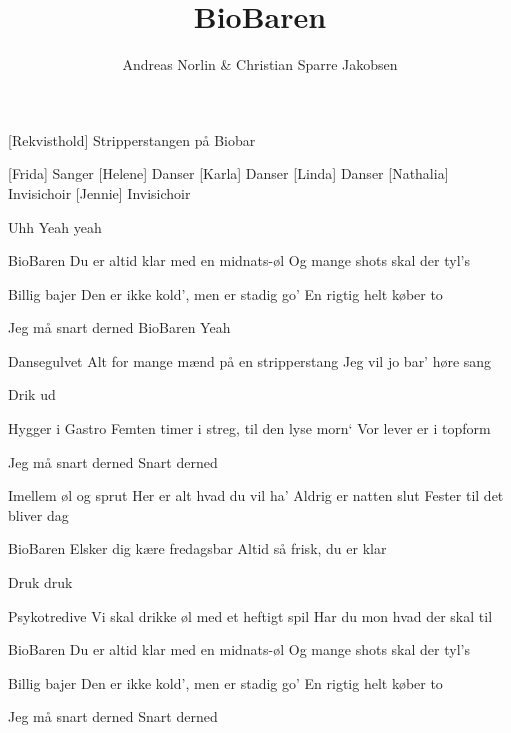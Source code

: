 \documentclass[a4paper,11pt]{article}
\title{BioBaren}
\author{Andreas Norlin \& Christian Sparre Jakobsen}
\begin{document}
\maketitle

\begin{props}
  [Rekvisthold] Stripperstangen på Biobar 
\end{props}

\begin{roles}
    [Frida] Sanger
    [Helene] Danser
    [Karla] Danser
    [Linda] Danser
    [Nathalia] Invisichoir
    [Jennie] Invisichoir
\end{roles}



\begin{song}


   Uhh
Yeah yeah
 
BioBaren
Du er altid klar med en midnats-øl
Og mange shots skal der tyl’s
 
Billig bajer
Den er ikke kold’, men er stadig go’
En rigtig helt køber to
 
 Jeg må snart derned
BioBaren
Yeah
 
Dansegulvet
Alt for mange mænd på en stripperstang
Jeg vil jo bar’ høre sang
 
Drik ud
 
Hygger i Gastro
Femten timer i streg, til den lyse morn`
Vor lever er i topform
 
Jeg må snart derned
Snart derned
 
Imellem øl og sprut
Her er alt hvad du vil ha’
Aldrig er natten slut
Fester til det bliver dag
 
BioBaren
Elsker dig kære fredagsbar
Altid så frisk, du er klar
 
Druk druk
 
Psykotredive
Vi skal drikke øl med et heftigt spil
Har du mon hvad der skal til
 
BioBaren
Du er altid klar med en midnats-øl
Og mange shots skal der tyl’s
 
Billig bajer
Den er ikke kold’, men er stadig go’
En rigtig helt køber to
 
Jeg må snart derned
Snart derned
\end{song}
\end{document}
